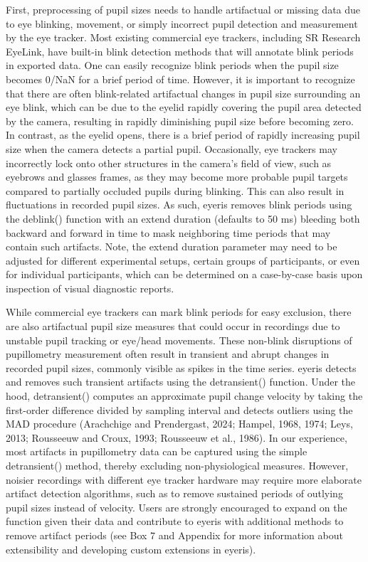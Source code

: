 First, preprocessing of pupil sizes needs to handle artifactual or missing data due to eye blinking, movement, or simply incorrect pupil detection and measurement by the eye tracker. Most existing commercial eye trackers, including SR Research EyeLink, have built-in blink detection methods that will annotate blink periods in exported data. One can easily recognize blink periods when the pupil size becomes 0/NaN for a brief period of time. However, it is important to recognize that there are often blink-related artifactual changes in pupil size surrounding an eye blink, which can be due to the eyelid rapidly covering the pupil area detected by the camera, resulting in rapidly diminishing pupil size before becoming zero. In contrast, as the eyelid opens, there is a brief period of rapidly increasing pupil size when the camera detects a partial pupil. Occasionally, eye trackers may incorrectly lock onto other structures in the camera’s field of view, such as eyebrows and glasses frames, as they may become more probable pupil targets compared to partially occluded pupils during blinking. This can also result in fluctuations in recorded pupil sizes. As such, eyeris removes blink periods using the deblink() function with an extend duration (defaults to 50 ms) bleeding both backward and forward in time to mask neighboring time periods that may contain such artifacts. Note, the extend duration parameter may need to be adjusted for different experimental setups, certain groups of participants, or even for individual participants, which can be determined on a case-by-case basis upon inspection of visual diagnostic reports.

While commercial eye trackers can mark blink periods for easy exclusion, there are also artifactual pupil size measures that could occur in recordings due to unstable pupil tracking or eye/head movements. These non-blink disruptions of pupillometry measurement often result in transient and abrupt changes in recorded pupil sizes, commonly visible as spikes in the time series. eyeris detects and removes such transient artifacts using the detransient() function. Under the hood, detransient() computes an approximate pupil change velocity by taking the first-order difference divided by sampling interval and detects outliers using the MAD procedure (Arachchige and Prendergast, 2024; Hampel, 1968, 1974; Leys, 2013; Rousseeuw and Croux, 1993; Rousseeuw et al., 1986). In our experience, most artifacts in pupillometry data can be captured using the simple detransient() method, thereby excluding non-physiological measures. However, noisier recordings with different eye tracker hardware may require more elaborate artifact detection algorithms, such as to remove sustained periods of outlying pupil sizes instead of velocity. Users are strongly encouraged to expand on the function given their data and contribute to eyeris with additional methods to remove artifact periods (see Box 7 and Appendix for more information about extensibility and developing custom extensions in eyeris).

